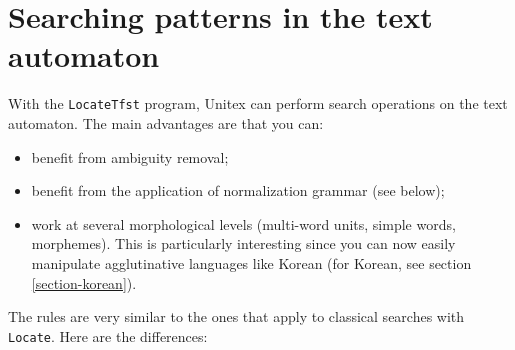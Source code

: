 \section{Searching patterns in the text automaton}
\label{section-locate-tfst}
With the \verb+LocateTfst+ program, Unitex can perform search operations on the
text automaton. The main advantages are that you can:
\begin{itemize}
    \item benefit from ambiguity removal;
    \item benefit from the application of normalization grammar (see below);
    \item work at several morphological levels (multi-word units, simple words,
    morphemes). This is particularly interesting since you can now
    easily manipulate agglutinative languages like Korean (for Korean, see
    section \ref{section-korean}).
   
\end{itemize}

 
\bigskip
\noindent The rules are very similar to the ones that apply to classical
searches with \verb+Locate+. Here are the differences:

